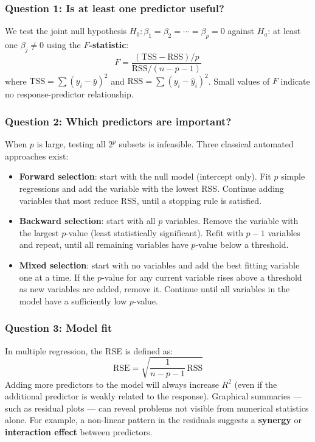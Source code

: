 \documentclass[11pt,a4paper]{article}
\theoremstyle{definition}
\theoremstyle{plain}
\theoremstyle{remark}
\begin{document}
\subsubsection{Question 1: Is at least one predictor useful?}

We test the joint null hypothesis $H_0: \beta_1 = \beta_2 = \cdots = \beta_p = 0$ against $H_a$: at least one $\beta_j \neq 0$ using the \textbf{$F$-statistic}:
\[
    F = \frac{(\mathrm{TSS} - \mathrm{RSS})/p}{\mathrm{RSS}/(n-p-1)}
\]
where $\mathrm{TSS} = \sum(y_i - \bar{y})^2$ and $\mathrm{RSS} = \sum(y_i - \hat{y}_i)^2$. Small values of $F$ indicate no response-predictor relationship.

\subsubsection{Question 2: Which predictors are important?}

When $p$ is large, testing all $2^p$ subsets is infeasible. Three classical automated approaches exist:

\begin{itemize}
    \item \textbf{Forward selection}: start with the null model (intercept only). Fit $p$ simple regressions and add the variable with the lowest RSS. Continue adding variables that most reduce RSS, until a stopping rule is satisfied.
    \item \textbf{Backward selection}: start with all $p$ variables. Remove the variable with the largest $p$-value (least statistically significant). Refit with $p-1$ variables and repeat, until all remaining variables have $p$-value below a threshold.
    \item \textbf{Mixed selection}: start with no variables and add the best fitting variable one at a time. If the $p$-value for any current variable rises above a threshold as new variables are added, remove it. Continue until all variables in the model have a sufficiently low $p$-value.
\end{itemize}

\subsubsection{Question 3: Model fit}

In multiple regression, the RSE is defined as:
\[
    \mathrm{RSE} = \sqrt{\frac{1}{n-p-1}\,\mathrm{RSS}}
\]
Adding more predictors to the model will always increase $R^2$ (even if the additional predictor is weakly related to the response). Graphical summaries — such as residual plots — can reveal problems not visible from numerical statistics alone. For example, a non-linear pattern in the residuals suggests a \textbf{synergy} or \textbf{interaction effect} between predictors.
\end{document}
